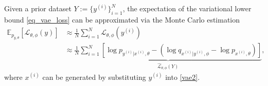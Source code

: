 Given a prior dataset $Y:=\{y^{(i)}\}_{i=1}^N$, the expectation of the variational lower bound  \eqref{eq_vae_loss} can be approximated via 
the Monte Carlo estimation
\begin{align}
    \mathbb{E}_{p_{y,\theta}}\left[\mathcal{L}_{\theta,\phi}(y)\right]&\approx \frac{1}{N}\sum_{i=1}^N\mathcal{L}_{\theta,\phi}\left(y^{(i)}\right)\nonumber\\
    &\approx\underbrace{\frac{1}{N}\sum_{i=1}^N\left[\log p_{y^{(i)}|x^{(i)},\theta}-(\log q_{x^{(i)}|y^{(i)},\phi}-\log p_{x^{(i)},\theta})\right]}_{\hat{\mathcal{L}}_{\theta,\phi}(Y)}, \label{vae_loss_discri}
\end{align}
where $x^{(i)}$ can be generated by substituting $y^{(i)}$ into  \eqref{vae2}.
